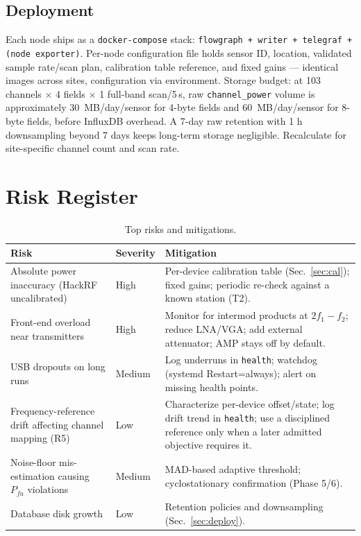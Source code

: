 \documentclass[12pt,a4paper]{report}
\begin{document}
 \subsection*{Deployment}
 \label{sec:deploy}
 Each node ships as a \texttt{docker-compose} stack:
 \texttt{flowgraph + writer + telegraf + (node exporter)}. Per-node
 configuration file holds sensor ID, location, validated sample rate/scan plan, calibration table reference,
 and fixed gains --- identical images across sites, configuration via
 environment.
 Storage budget: at 103 channels $\times$ 4 fields $\times$ 1 full-band
 scan/5\,s, raw \texttt{channel\_power} volume is approximately
 \SI{30}{MB}/day/sensor for 4-byte fields and \SI{60}{MB}/day/sensor for
 8-byte fields, before InfluxDB overhead. A 7-day raw retention with 1 h
 downsampling beyond 7 days keeps long-term storage negligible. Recalculate
 for site-specific channel count and scan rate.
 \section{Risk Register}
 \label{sec:risks}
 \begin{table}[htbp]
 	\centering\small
 	\caption{Top risks and mitigations.}
 	\label{tab:risks}
 	\begin{tabular}{@{}p{4.6cm}p{1.1cm}p{8.2cm}@{}}
 		\toprule
 		\textbf{Risk} & \textbf{Severity} & \textbf{Mitigation} \\
 		\midrule
 		Absolute power inaccuracy (HackRF uncalibrated) &
 		High &
 		Per-device calibration table (Sec.~\ref{sec:cal}); fixed gains; periodic
 		re-check against a known station (T2). \\
 		Front-end overload near transmitters &
 		High &
 		Monitor for intermod products at $2f_1-f_2$; reduce LNA/VGA; add external
 		attenuator; AMP stays off by default. \\
 		USB dropouts on long runs &
 		Medium &
 		Log underruns in \texttt{health}; watchdog (systemd Restart=always);
 		alert on missing health points. \\
 		Frequency-reference drift affecting channel mapping (R5) &
		Low &
		Characterize per-device offset/state; log drift trend in \texttt{health}; use a disciplined reference only when a later admitted objective requires it. \\
 		Noise-floor mis-estimation causing $P_{fa}$ violations &
 		Medium &
 		MAD-based adaptive threshold; cyclostationary confirmation (Phase 5/6). \\
 		Database disk growth &
 		Low &
 		Retention policies and downsampling (Sec.~\ref{sec:deploy}). \\
 		\bottomrule
 	\end{tabular}
 \end{table}
\end{document}
